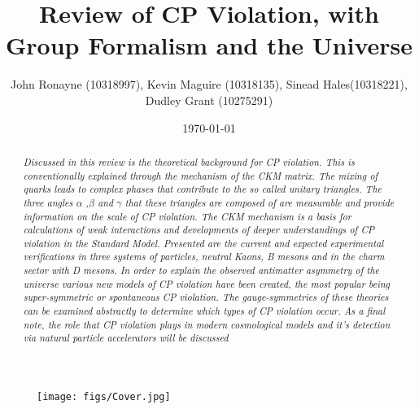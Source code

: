 \documentclass[floatfix,aps,prd,amsmath,amssymb]{revtex4}
\begin{document}
\title{Review of CP Violation, with Group Formalism and the Universe}
\author{John Ronayne (10318997), Kevin Maguire (10318135), Sinead Hales(10318221), Dudley Grant (10275291)}
\date{\today}

\begin{abstract}
\textit{Discussed in this review is the theoretical background for CP violation. This is conventionally explained through the mechanism of the CKM matrix. The mixing of quarks leads to complex phases that contribute to the so called unitary triangles. The three angles $\alpha$ ,$\beta$ and $\gamma$ that these triangles are composed of are measurable and provide information on the scale of CP violation. The CKM mechanism is a basis for calculations of weak interactions and developments of deeper understandings of CP violation in the Standard Model. Presented are the current and expected experimental verifications in three systems of particles, neutral Kaons, B mesons and in the charm sector with D mesons. In order to explain the observed antimatter asymmetry of the universe various new models of CP violation have been created, the most popular being super-symmetric or spontaneous CP violation. The gauge-symmetries of these theories can be examined abstractly to determine which types of CP violation occur. As a final note, the role that CP violation plays in modern cosmological models and it's detection via natural particle accelerators will be discussed}
\end{abstract}

\maketitle
{}

\begin{figure}[h!]
\begin{center}
\texttt{[image: figs/Cover.jpg]}
\end{center}
\end{figure}

\newpage

\tableofcontents
{}

\newpage
 









\end{document}
